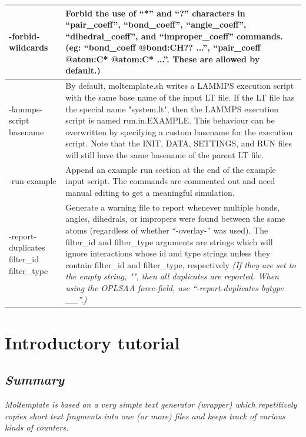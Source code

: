 \documentclass[11pt]{article}
\begin{document}
\begin{longtable}[h]{l|p{10cm}}
-forbid-wildcards &
Forbid the use of ``*'' and ``?'' characters in
``pair\_coeff'', ``bond\_coeff'', ``angle\_coeff'', ``dihedral\_coeff'',
and ``improper\_coeff'' commands.  (eg: ``bond\_coeff @bond:CH?? ...'', ``pair\_coeff @atom:C* @atom:C* ...''.  These are allowed by default.)
\\
\hline
-lammps-script basename &
                By default, moltemplate.sh writes a LAMMPS execution script with
		the same base name of the input LT file. If the LT file has the
		special name "system.lt", then the LAMMPS execution script is
		named run.in.EXAMPLE. This behaviour can be overwritten by
		specifying a custom basename for the execution script. Note that
		the INIT, DATA, SETTINGS, and RUN files will still have the same
		basename of the parent LT file.
\\
\hline
-run-example &
    Append an example run section at the end of the example input
                script. The commands are commented out and need manual editing
		to get a meaningful simulation.
\\
\hline
-report-duplicates filter\_id filter\_type &
Generate a warning file to report whenever multiple bonds, angles, dihedrals,
or impropers were found between the same atoms (regardless of whether ``-overlay-'' was used).
The filter\_id and filter\_type arguments are strings which will ignore interactions
whose id and type strings unless they contain filter\_id and filter\_type, respectively
\textit{(If they are set to the empty string, "", then all duplicates are reported.
When using the OPLSAA force-field, use ``-report-duplicates bytype \_\_''.)}
\\
\hline\hline
\end{longtable}


\pagebreak




\section{Introductory tutorial}
\label{sec:tutorial}
\subsection*{\textit{Summary}}
\textit{Moltemplate is based on a very simple text generator (wrapper) which 
repetitively copies short text fragments into one (or more) files 
and keeps track of various kinds of counters.}
\end{document}
